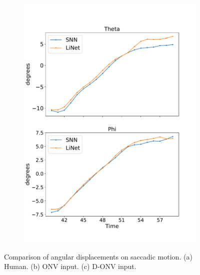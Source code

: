 \documentclass [MS] {UCLAthesis}
\begin{document}
\begin{figure}
\begin{subfigure}{0.2\textwidth}
        \caption{}
        \label{fig:saccade_human_ori_normal}
    \end{subfigure}
    \hfill
    \begin{subfigure}{0.2\textwidth}
        \centering
        \includegraphics[width=\textwidth]{saccade_human_ori_delta}
        \caption{}
        \label{fig:saccade_human_ori_delta}
    \end{subfigure}

    \caption[Angular displacements from saccadic motion, compared to a human subject]{Comparison of angular displacements on saccadic motion. (a) Human. (b) ONV input. (c) D-ONV input.}
    \label{fig:saccade_ori}
\end{figure}
\end{document}
